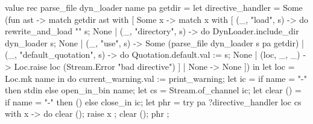 \begin{ocamlcode}
value rec parse_file dyn_loader name pa getdir =
  let directive_handler = Some (fun ast ->
    match getdir ast with
    [ Some x ->
        match x with
        [ (_, "load", s) -> do { rewrite_and_load "" s; None }
        | (_, "directory", s) -> do { DynLoader.include_dir dyn_loader s; None }
        | (_, "use", s) -> Some (parse_file dyn_loader s pa getdir)
        | (_, "default_quotation", s) -> do { Quotation.default.val := s; None }
        | (loc, _, _) -> Loc.raise loc (Stream.Error "bad directive") ]
    | None -> None ]) in
  let loc = Loc.mk name
  in do {
    current_warning.val := print_warning;
    let ic = if name = "-" then stdin else open_in_bin name;
    let cs = Stream.of_channel ic;
    let clear () = if name = "-" then () else close_in ic;
    let phr =
      try pa ?directive_handler loc cs
      with x -> do { clear (); raise x };
    clear ();
    phr
  };
\end{ocamlcode}

